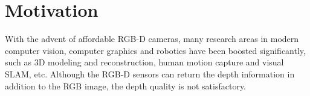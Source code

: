 
\section{Motivation}
With the advent of affordable RGB-D cameras, many research areas in modern computer vision, computer graphics and robotics have been boosted significantly, such as 3D modeling and reconstruction, human motion capture and visual SLAM, etc.
Although the RGB-D sensors can return the depth information in addition to the RGB image, the depth quality is not satisfactory.


